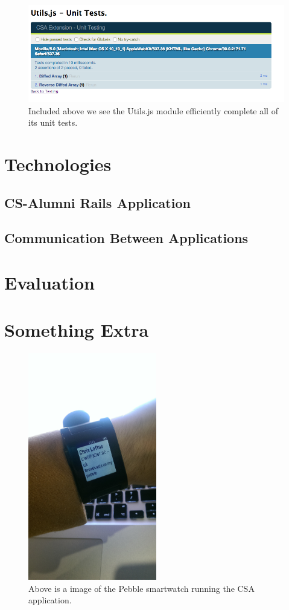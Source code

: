 \documentclass{article}
\begin{document}
\begin{figure}[!htbp]
\centering
\includegraphics[width=\textwidth]{utilsqunit}
\caption{Included above we see the Utils.js module efficiently complete all of its unit tests.}
\end{figure}

\section*{Technologies}

\subsection{CS-Alumni Rails Application}

\subsection{Communication Between Applications}


\section{Evaluation}

\section{Something Extra}
\begin{figure}[!htbp]
\centering
\includegraphics[width=0.5\textwidth]{pebble}
\caption{Above is a image of the Pebble smartwatch running the CSA application.}
\end{figure}
\end{document}
